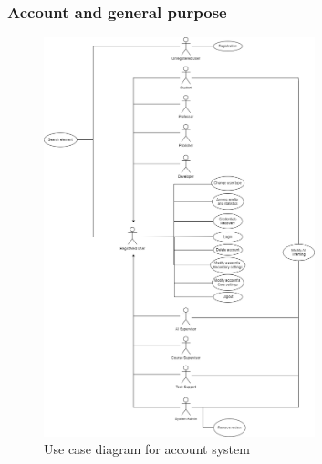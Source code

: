 \subsubsection{Account and general purpose}
\begin{figure}[h]
	\centering
	\includegraphics[width=0.7\textwidth]{images/UC-account.png}
	\caption{Use case diagram for account system}
	\label{fig:UC-account}
\end{figure}

\newpage
